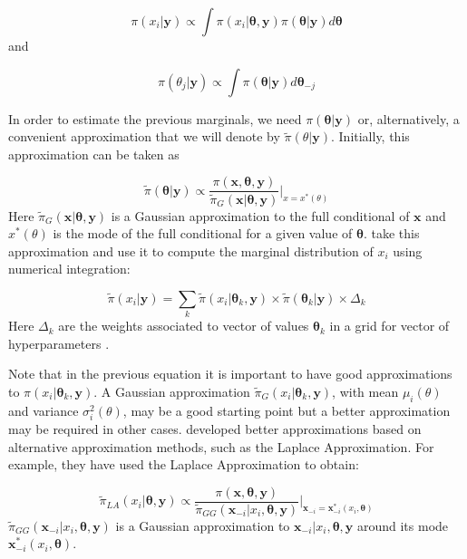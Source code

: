 \documentclass[article]{jss}
\begin{document}
$$
\pi(x_i|\mathbf{y}) \propto \int \pi(x_i|\mathbf{\theta}, \mathbf{y})  \pi(\mathbf{\theta}| \mathbf{y}) d\mathbf{\theta}
$$
\noindent
and

$$
\pi(\theta_j|\mathbf{y}) \propto \int \pi(\mathbf{\theta}| \mathbf{y})  d\mathbf{\theta}_{-j} 
$$

In order to estimate the previous marginals, we need 
$\pi(\mathbf{\theta}|\mathbf{y})$ or, alternatively, a convenient
approximation that we will denote by $\tilde\pi(\theta|\mathbf{y})$.
Initially, this approximation can be taken as

$$
\tilde\pi(\mathbf{\theta}|\mathbf{y})\propto 
\frac{\pi(\mathbf{x},\mathbf{\theta},\mathbf{y})}{\tilde\pi_G(\mathbf{x}|\mathbf{\theta},\mathbf{y})}\bigg|_{x=x^*(\theta)}
$$
\noindent
Here 
$\tilde\pi_G(\mathbf{x}|\mathbf{\theta},\mathbf{y})$ is a Gaussian
approximation to the full conditional of $\mathbf{x}$ and $x^*(\theta)$
is the mode of the full conditional for a given value of $\mathbf{\theta}$.
\citet{isi:000264374200002} take this approximation and use it 
to compute the marginal distribution of $x_i$ using numerical integration:

$$
\tilde\pi(x_i|\mathbf{y})= 
\sum_k \tilde\pi (x_i|\mathbf{\theta}_k, \mathbf{y})\times 
\tilde\pi(\mathbf{\theta}_k|\mathbf{y})\times \Delta_k
$$
\noindent
Here $\Delta_k$ are the weights associated to vector of values
$\mathbf{\theta}_k$ in a grid for vector of hyperparameters .


Note that in the previous equation it is important to have good approximations
to $\pi (x_i|\mathbf{\theta}_k, \mathbf{y})$. A Gaussian approximation
$\tilde\pi_G (x_i|\mathbf{\theta}_k, \mathbf{y})$, with mean $\mu_i(\theta)$
and variance $\sigma^2_i(\theta)$, may be a good starting point but a better
approximation may be required in other cases. \citet{isi:000264374200002}
developed better approximations based on alternative approximation methods,
such as the Laplace Approximation.  For example, they have used the Laplace
Approximation to obtain:

$$
\tilde\pi_{LA}(x_i|\mathbf{\theta}, \mathbf{y}) \propto 
\frac{\pi(\mathbf{x}, \mathbf{\theta}, \mathbf{y})}
{\tilde\pi_{GG}(\mathbf{x}_{-i}|x_i, \mathbf{\theta}, \mathbf{y})}
\bigg|_{\mathbf{x}_{-i}=\mathbf{x}^*_{-i}(x_i, \mathbf{\theta})}
$$
\noindent
$\tilde\pi_{GG}(\mathbf{x}_{-i}|x_i, \mathbf{\theta}, \mathbf{y})$ is a
Gaussian  approximation to $\mathbf{x}_{-i}|x_i, \mathbf{\theta}, \mathbf{y}$
around its mode $\mathbf{x}^*_{-i}(x_i, \mathbf{\theta})$.
\end{document}
